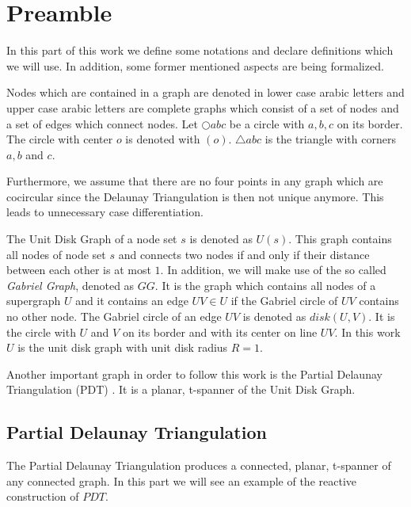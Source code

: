 \section{Preamble}
In this part of this work we define some notations and declare definitions which we will use.
In addition, some former mentioned aspects are being formalized.

Nodes which are contained in a graph are denoted in lower case arabic letters and upper case arabic letters are complete graphs which consist of a set of nodes and a set of edges which connect nodes.
Let $\bigcirc{abc} $ be a circle with $a, b, c $ on its border.
The circle with center $o $ is denoted with $(o) $.
$\triangle{abc} $ is the triangle with corners $a,b $ and $c $.

Furthermore, we assume that there are no four points in any graph which are cocircular since the Delaunay Triangulation is then not unique anymore.
This leads to unnecessary case differentiation.

The Unit Disk Graph of a node set $s $ is denoted as $U(s) $.
This graph contains all nodes of node set $s $ and connects two nodes if and only if their distance between each other is at most $1 $.
In addition, we will make use of the so called \emph{Gabriel Graph}, denoted as $GG $. 
It is the graph which contains all nodes of a supergraph $U $ and it contains an edge $UV \in U $ if the Gabriel circle of $UV $ contains no other node.
The Gabriel circle of an edge $UV $ is denoted as $disk(U, V) $.
It is the circle with $U $ and $V $ on its border and with its center on line $UV $. 
In this work $U $ is the unit disk graph with unit disk radius $R = 1 $.

Another important graph in order to follow this work is the Partial Delaunay Triangulation (PDT)  \cite{pdt}. It is a planar, t-spanner of the Unit Disk Graph.

\subsection{Partial Delaunay Triangulation}
The Partial Delaunay Triangulation produces a connected, planar, t-spanner of any connected graph.
In this part we will see an example of the reactive construction of $PDT $.

